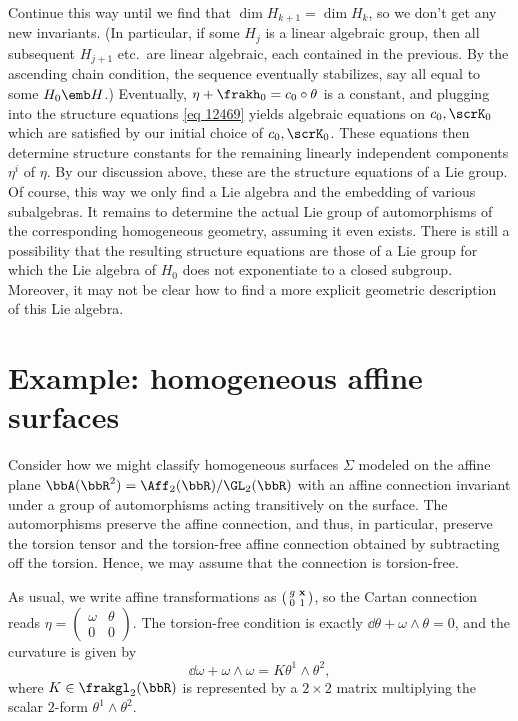 Continue this way until we find that $\dim H_{k+1}=\dim H_k$, so we don't get any new invariants. (In particular, if some $H_j$ is a linear algebraic group, then all subsequent $H_{j+1}$ etc.\ are linear algebraic, each contained in the previous. By the ascending chain condition, the sequence eventually stabilizes, say all equal to some $H_0\emb H$.) Eventually, $\eta+\frakh_0=c_0\circ\theta$ is a constant, and plugging into the structure equations \eqref{eq 12469} yields algebraic equations on $c_0,\scrK_0$ which are satisfied by our initial choice of $c_0,\scrK_0$. These equations then determine structure constants for the remaining linearly independent components $\eta^i$ of $\eta$. By our discussion above, these are the structure equations of a Lie group. Of course, this way we only find a Lie algebra and the embedding of various subalgebras. It remains to determine the actual Lie group of automorphisms of the corresponding homogeneous geometry, assuming it even exists. There is still a possibility that the resulting structure equations are those of a Lie group for which the Lie algebra of $H_0$ does not exponentiate to a closed subgroup. Moreover, it may not be clear how to find a more explicit geometric description of this Lie algebra.







\section{Example: homogeneous affine surfaces}


Consider how we might classify homogeneous surfaces $\varSigma$ modeled on the affine plane $\bbA(\bbR^2)=\Aff_2(\bbR)\slash \GL_2(\bbR)$ with an affine connection invariant under a group of automorphisms acting transitively on the surface. The automorphisms preserve the affine connection, and thus, in particular, preserve the torsion tensor and the torsion-free affine connection obtained by subtracting off the torsion. Hence, we may assume that the connection is torsion-free.

As usual, we write affine transformations as $\left(\begin{smallmatrix}
    g & \bf{x}\\ 0 & 1
\end{smallmatrix}\right)$, so the Cartan connection reads $\eta=\left(\begin{smallmatrix}
    \omega & \theta\\ 0 & 0
\end{smallmatrix}\right)$. The torsion-free condition is exactly $\dd\theta+\omega\wedge\theta=0$, and the curvature is given by 
\[\dd\omega+\omega\wedge\omega=K \theta^1\wedge\theta^2,\label{eq 129521}\]
where $K\in\frakgl_2(\bbR)$ is represented by a $2\times 2$ matrix multiplying the scalar $2$-form $\theta^1\wedge\theta^2$.


